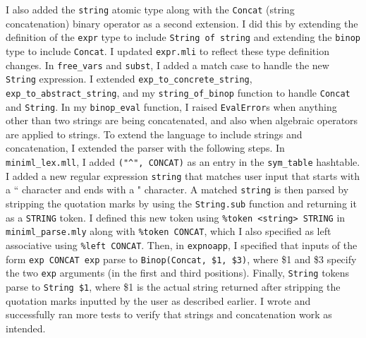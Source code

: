 \documentclass[12pt]{article}
\begin{document}
\par I also added the {\tt string} atomic type along with the {\tt Concat} (string concatenation) binary operator as a second extension. I did this by extending the definition of the {\tt expr} type to include {\tt String of string} and extending the {\tt binop} type to include {\tt Concat}. I updated {\tt expr.mli} to reflect these type definition changes. In {\tt free\_vars} and {\tt subst}, I added a match case to handle the new {\tt String} expression. I extended {\tt exp\_to\_concrete\_string}, {\tt exp\_to\_abstract\_string}, and my {\tt string\_of\_binop} function to handle {\tt Concat} and {\tt String}. In my {\tt binop\_eval} function, I raised {\tt EvalError}s when anything other than two strings are being concatenated, and also when algebraic operators are applied to strings. To extend the language to include strings and concatenation, I extended the parser with the following steps. In {\tt miniml\_lex.mll}, I added {\tt ("\string^", CONCAT)} as an entry in the {\tt sym\_table} hashtable. I added a new regular expression {\tt string} that matches user input that starts with a `` character and ends with a " character. A matched {\tt string} is then parsed by stripping the quotation marks by using the {\tt String.sub} function and returning it as a {\tt STRING} token. I defined this new token using {\tt \%token <string> STRING} in {\tt miniml\_parse.mly} along with {\tt \%token CONCAT}, which I also specified as left associative using {\tt \%left CONCAT}. Then, in {\tt expnoapp}, I specified that inputs of the form {\tt exp CONCAT exp} parse to {\tt Binop(Concat, \$1, \$3)}, where \$1 and \$3 specify the two {\tt exp} arguments (in the first and third positions). Finally, {\tt String} tokens parse to {\tt String \$1}, where \$1 is the actual string returned after stripping the quotation marks inputted by the user as described earlier. I wrote and successfully ran more tests to verify that strings and concatenation work as intended.
\end{document}
